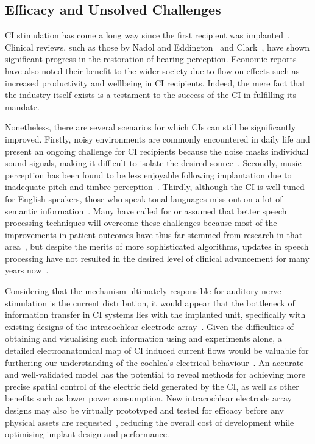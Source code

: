 \subsection{Efficacy and Unsolved Challenges}

CI stimulation has come a long way since the first recipient was
implanted~\cite{black1980,clark2013}. Clinical reviews, such as those by Nadol
and Eddington~\cite{nadol1988treatment} and Clark~\cite{clark1996}, have shown
significant progress in the restoration of hearing perception. Economic
reports~\cite{economics2006} have also noted their benefit to the wider society
due to flow on effects such as increased productivity and wellbeing in CI
recipients. Indeed, the mere fact that the industry itself exists is a testament
to the success of the CI in fulfilling its mandate.

Nonetheless, there are several scenarios for which CIs can still be
significantly improved. Firstly, noisy environments are commonly encountered in
daily life and present an ongoing challenge for CI recipients because the noise
masks individual sound signals, making it difficult to isolate the desired
source~\cite{stickney2004,gfeller2007}. Secondly, music perception has been
found to be less enjoyable following implantation due to inadequate pitch and
timbre perception~\cite{leal2003,mcdermott2004,sucher2007}. Thirdly, although
the CI is well tuned for English speakers, those who speak tonal languages miss
out on a lot of semantic
information~\cite{ciocca2002,xu2002,wei2004,vandenhonert2007}. Many have called
for or assumed that better speech processing techniques will overcome these
challenges because most of the improvements in patient outcomes have thus far
stemmed from research in that
area~\cite{skinner1994,loizou1998,micco2006,vandenhonert2007}, but despite the
merits of more sophisticated algorithms, updates in speech processing have not
resulted in the desired level of clinical advancement for many years
now~\cite{seligman2004,zeng2008}.

Considering that the mechanism ultimately responsible for auditory nerve
stimulation is the \invivo{} current distribution, it would appear that the
bottleneck of information transfer in CI systems lies with the implanted unit,
specifically with existing designs of the intracochlear electrode
array~\cite{clark2008,clark2013}. Given the difficulties of obtaining and
visualising such information using \invivo{} and \invitro{} experiments alone, a
detailed \insilico{} electroanatomical map of CI induced current flows would be
valuable for furthering our understanding of the cochlea's electrical
behaviour~\cite{spelman1982,girzon1987,suesserman1993,frijns1995,schimpf1998,
micco2006,whiten2007,potratz2010}. An accurate and well-validated model has the
potential to reveal methods for achieving more precise spatial control of the
electric field generated by the CI, as well as other benefits such as lower
power consumption. New intracochlear electrode array designs may also be
virtually prototyped and tested for efficacy before any physical assets are
requested~\cite{zeng2004}, reducing the overall cost of development while
optimising implant design and performance.

